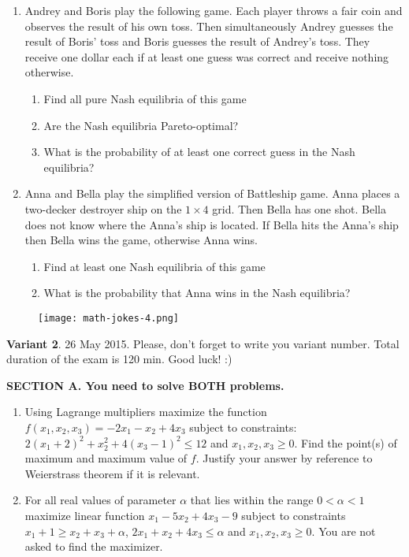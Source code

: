 \documentclass[12pt,a4paper]{article}
\begin{document}
\begin{enumerate}[resume]

\item Andrey and Boris play the following game. Each player throws a fair coin and observes the result of his own toss. Then simultaneously Andrey guesses the result of Boris' toss and Boris guesses the result of Andrey's toss. They receive one dollar each if at least one guess was correct and receive nothing otherwise. 

\begin{enumerate}
\item Find all pure Nash equilibria of this game
\item Are the Nash equilibria Pareto-optimal?
\item What is the probability of at least one correct guess in the Nash equilibria?
\end{enumerate}

\item Anna and Bella play the simplified version of Battleship game. Anna places a two-decker destroyer ship on the $1\times 4$ grid. Then Bella has one shot. Bella does not know where the Anna's ship is located. If Bella hits the Anna's ship then Bella wins the game, otherwise Anna wins. 

\begin{enumerate}
\item Find at least one Nash equilibria of this game
\item What is the probability that Anna wins in the Nash equilibria?
\end{enumerate}


\end{enumerate}

\begin{figure}[hbtp]
\centering
\texttt{[image: math-jokes-4.png]}
\end{figure}


\newpage
\thispagestyle{empty}
\textbf{Variant 2}. 26 May 2015. Please, don't forget to write you variant number. Total duration of the exam is 120 min. Good luck! :) 

\vspace{0.6cm}

\textbf{SECTION A. You need to solve BOTH problems.}

\begin{enumerate}

\item Using Lagrange multipliers maximize the function $f(x_1,x_2,x_3)=-2x_1-x_2+4x_3$ subject to constraints:   $2(x_1+2)^2+x_2^2+4(x_3-1)^2\leq 12$ and $x_1, x_2, x_3 \geq 0$. Find the point(s) of maximum and maximum value of $f$. Justify your answer by reference to Weierstrass theorem if it is relevant.

\item For all real values of parameter $\alpha$ that lies within the range $0<\alpha<1$ maximize linear function $x_1-5x_2+4x_3-9$ subject to constraints  $x_1+1\geq x_2+x_3+\alpha$,  $2x_1+x_2+4x_3\leq \alpha$ and $x_1, x_2, x_3 \geq 0$. You are not asked to find the maximizer.

\end{enumerate}
\end{document}

